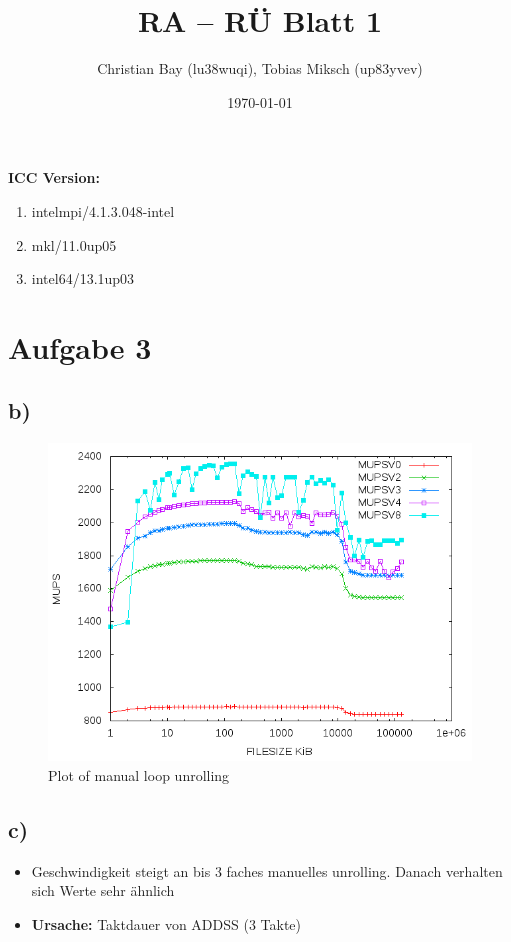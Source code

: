 \documentclass{article}
\title{RA -- R\"U Blatt 1}
\author{Christian Bay (lu38wuqi), Tobias Miksch (up83yvev)}
\date{\today}
\begin{document}
\maketitle

\textbf{ICC Version:}
\begin{enumerate}
	\item intelmpi/4.1.3.048-intel
	\item mkl/11.0up05
	\item intel64/13.1up03
\end{enumerate}

\vspace*{6pt}

\section*{Aufgabe 3}
\subsection*{b)}

\begin{center}
	\begin{figure}[h]
	\includegraphics[scale=0.6]{pics/a3b.png}
	\caption{Plot of manual loop unrolling}
	\end{figure}
\end{center}

\subsection*{c)}
\begin{itemize}
	\item Geschwindigkeit steigt an bis 3 faches manuelles unrolling.
		Danach verhalten sich Werte sehr ähnlich
	\item \textbf{Ursache:} Taktdauer von ADDSS (3 Takte)
\end{itemize}
\end{document}
